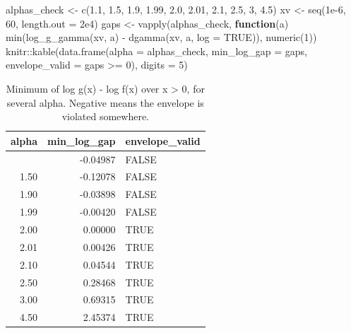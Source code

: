 \documentclass[
  letterpaper,
  DIV=11,
  numbers=noendperiod]{scrreprt}
\newenvironment{Shaded}{\begin{snugshade}}{\end{snugshade}}
\newcommand{\AttributeTok}[1]{\textcolor[rgb]{0.40,0.45,0.13}{#1}}
\newcommand{\ConstantTok}[1]{\textcolor[rgb]{0.56,0.35,0.01}{#1}}
\newcommand{\ControlFlowTok}[1]{\textcolor[rgb]{0.00,0.23,0.31}{\textbf{#1}}}
\newcommand{\DecValTok}[1]{\textcolor[rgb]{0.68,0.00,0.00}{#1}}
\newcommand{\FloatTok}[1]{\textcolor[rgb]{0.68,0.00,0.00}{#1}}
\newcommand{\FunctionTok}[1]{\textcolor[rgb]{0.28,0.35,0.67}{#1}}
\newcommand{\NormalTok}[1]{\textcolor[rgb]{0.00,0.23,0.31}{#1}}
\newcommand{\OtherTok}[1]{\textcolor[rgb]{0.00,0.23,0.31}{#1}}
\newcommand{\SpecialCharTok}[1]{\textcolor[rgb]{0.37,0.37,0.37}{#1}}
\begin{document}
\begin{Shaded}
\begin{Highlighting}[]
\NormalTok{alphas\_check }\OtherTok{\textless{}{-}} \FunctionTok{c}\NormalTok{(}\FloatTok{1.1}\NormalTok{, }\FloatTok{1.5}\NormalTok{, }\FloatTok{1.9}\NormalTok{, }\FloatTok{1.99}\NormalTok{, }\FloatTok{2.0}\NormalTok{, }\FloatTok{2.01}\NormalTok{, }\FloatTok{2.1}\NormalTok{, }\FloatTok{2.5}\NormalTok{, }\DecValTok{3}\NormalTok{, }\FloatTok{4.5}\NormalTok{)}
\NormalTok{xv }\OtherTok{\textless{}{-}} \FunctionTok{seq}\NormalTok{(}\FloatTok{1e{-}6}\NormalTok{, }\DecValTok{60}\NormalTok{, }\AttributeTok{length.out =} \FloatTok{2e4}\NormalTok{)}
\NormalTok{gaps }\OtherTok{\textless{}{-}} \FunctionTok{vapply}\NormalTok{(alphas\_check, }\ControlFlowTok{function}\NormalTok{(a) }\FunctionTok{min}\NormalTok{(}\FunctionTok{log\_g\_gamma}\NormalTok{(xv, a) }\SpecialCharTok{{-}} \FunctionTok{dgamma}\NormalTok{(xv, a, }\AttributeTok{log =} \ConstantTok{TRUE}\NormalTok{)), }\FunctionTok{numeric}\NormalTok{(}\DecValTok{1}\NormalTok{))}
\NormalTok{knitr}\SpecialCharTok{::}\FunctionTok{kable}\NormalTok{(}\FunctionTok{data.frame}\NormalTok{(}\AttributeTok{alpha =}\NormalTok{ alphas\_check, }\AttributeTok{min\_log\_gap =}\NormalTok{ gaps, }\AttributeTok{envelope\_valid =}\NormalTok{ gaps }\SpecialCharTok{\textgreater{}=} \DecValTok{0}\NormalTok{), }\AttributeTok{digits =} \DecValTok{5}\NormalTok{)}
\end{Highlighting}
\end{Shaded}

{

\begin{longtable}[]{@{}rrl@{}}

\caption{\label{tbl-envelope-threshold}Minimum of log g(x) - log f(x)
over x \textgreater{} 0, for several alpha. Negative means the envelope
is violated somewhere.}

\tabularnewline

\toprule\noalign{}
alpha & min\_log\_gap & envelope\_valid \\
\midrule\noalign{}
\endhead
\bottomrule\noalign{}
\endlastfoot
1.10 & -0.04987 & FALSE \\
1.50 & -0.12078 & FALSE \\
1.90 & -0.03898 & FALSE \\
1.99 & -0.00420 & FALSE \\
2.00 & 0.00000 & TRUE \\
2.01 & 0.00426 & TRUE \\
2.10 & 0.04544 & TRUE \\
2.50 & 0.28468 & TRUE \\
3.00 & 0.69315 & TRUE \\
4.50 & 2.45374 & TRUE \\

\end{longtable}

}
\end{document}
